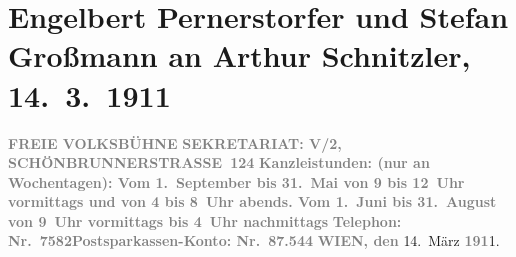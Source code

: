 

         \newcommand{\erwaehnteInstitutionen}{Institutionen: Wiener Freie Volksbühne}
         \newcommand{\erwaehnteOrte}{Orte: Schönbrunnerstraße, Wien}
         \newcommand{\erwaehnteWerke}{Werke: Der Strom. Organ der Wiener Freien Volksbühne}
               \section[Engelbert Pernerstorfer und Stefan Großmann an Arthur Schnitzler, 14. 3. 1911]{ Engelbert Pernerstorfer und Stefan Großmann an Arthur Schnitzler,
                    14. 3. 1911}\nopagebreak{}\rehead{ }\begin{ledgroupsized}[t]{13cm}\normalsize\beginnumbering \toendnotes[C]{\smallbreak\pagebreak[2]} 
\toendnotes[C]{\smallbreak}\pstart
           \noindent{}{\pb}\textcolor{gray}{\textbf{FREIE VOLKSBÜHNE}}\pend
           \pstart
           \textcolor{gray}{\textbf{SEKRETARIAT: V/2,
                                    SCHÖNBRUNNERSTRASSE 124}}\pend
           \pstart
           \textcolor{gray}{\textbf{Kanzleistunden: (nur an Wochentagen): Vom 1. September
                            bis 31. Mai von 9 bis 12 Uhr vormittags und von 4 bis 8 Uhr abends. Vom
                            1. Juni bis 31. August von 9 Uhr vormittags bis 4 Uhr nachmittags}}\pend
           \pstart
           \textcolor{gray}{\textbf{Telephon: Nr. 7582}}\hfill \textcolor{gray}{\textbf{Postsparkassen-Konto: Nr. 87.544}}\pend
           \pstart
           \raggedleft{}\textcolor{gray}{\textbf{WIEN, den}}{ }14. März \textcolor{gray}{\textbf{191}}1.\pend

\end{ledgroupsized}
